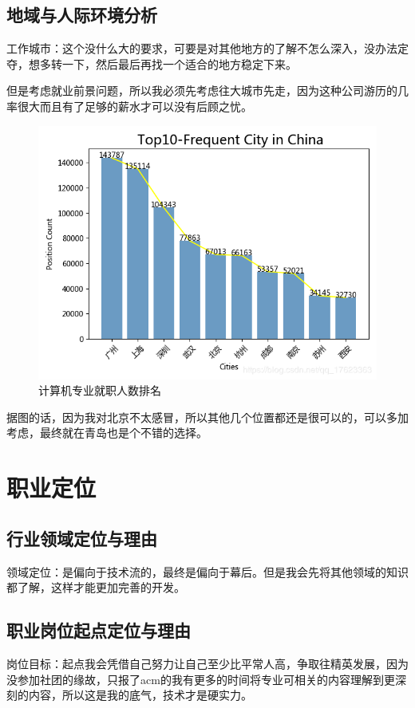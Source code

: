 \documentclass{article}
\begin{document}
\subsection{地域与人际环境分析}
工作城市：这个没什么大的要求，可要是对其他地方的了解不怎么深入，没办法定夺，想多转一下，然后最后再找一个适合的地方稳定下来。\par
但是考虑就业前景问题，所以我必须先考虑往大城市先走，因为这种公司游历的几率很大而且有了足够的薪水才可以没有后顾之忧。\par 

\begin{figure}[h]
	\centering
	\includegraphics[scale=0.4]{111}
	\caption{计算机专业就职人数排名}
	\label{fig:111}
	\end{figure} \par

据图的话，因为我对北京不太感冒，所以其他几个位置都还是很可以的，可以多加考虑，最终就在青岛也是个不错的选择。\par 
\section{职业定位}
\subsection{行业领域定位与理由}
领域定位：是偏向于技术流的，最终是偏向于幕后。但是我会先将其他领域的知识都了解，这样才能更加完善的开发。
\subsection{职业岗位起点定位与理由}
岗位目标：起点我会凭借自己努力让自己至少比平常人高，争取往精英发展，因为没参加社团的缘故，只报了acm的我有更多的时间将专业可相关的内容理解到更深刻的内容，所以这是我的底气，技术才是硬实力。\par
\end{document}
